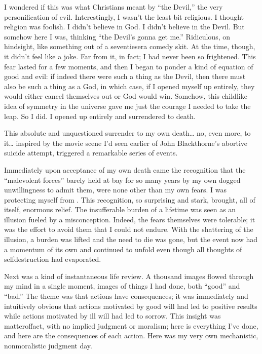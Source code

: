 \documentclass[a5paper,10pt,english]{book}
\begin{document}
\sphinxAtStartPar
I wondered if this was what Christians meant by “the Devil,” the very
personification of evil. Interestingly, I wasn’t the least bit
religious. I thought religion was foolish. I didn’t believe in God. I
didn’t believe in the Devil. But somehow here I was, thinking “the
Devil’s gonna get me.” Ridiculous, on hindsight, like something out of a
seventies\sphinxhyphen{}era comedy skit. At the time, though, it didn’t feel like a
joke. Far from it, in fact; I had never been so frightened. This fear
lasted for a few moments, and then I began to ponder a kind of equation
of good and evil: if indeed there were such a thing as the Devil, then
there must also be such a thing as a God, in which case, if I opened
myself up entirely, they would either cancel themselves out or God would
win. Somehow, this childlike idea of symmetry in the universe gave me
just the courage I needed to take the leap. So I did. I opened up
entirely and surrendered to death.

\sphinxAtStartPar
This absolute and unquestioned surrender to my own death… no, even more,
 to it… inspired by the movie scene I’d seen earlier of John
Blackthorne’s abortive suicide attempt, triggered a remarkable series of
events.

\sphinxAtStartPar
Immediately upon acceptance of my own death came the recognition that
the “malevolent forces” barely held at bay for so many years by my own
dogged unwillingness to admit them, were none other than my own fears. I
was protecting myself from . This recognition, so surprising and
stark, brought, all of itself, enormous relief. The insufferable burden
of a lifetime was seen as an illusion fueled by a misconception. Indeed,
the fears themselves were tolerable; it was the effort to avoid them
that I could not endure. With the shattering of the illusion, a burden
was lifted and the need to die was gone, but the event now had a
momentum of its own and continued to unfold even though all thoughts of
self\sphinxhyphen{}destruction had evaporated.

\sphinxAtStartPar
Next was a kind of instantaneous life review. A thousand images flowed
through my mind in a single moment, images of things I had done, both
“good” and “bad.” The theme was that actions have consequences; it was
immediately and intuitively obvious that actions motivated by good will
had led to positive results while actions motivated by ill will had led
to sorrow. This insight was matter\sphinxhyphen{}of\sphinxhyphen{}fact, with no implied judgment or
moralism; here is everything I’ve done, and here are the consequences of
each action. Here was my very own mechanistic, non\sphinxhyphen{}moralistic judgment
day.
\end{document}
